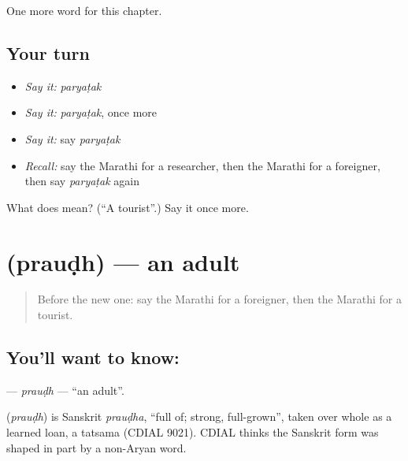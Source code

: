 \begin{grammarlens}[title={What you've built}]
One more word for this chapter.
\end{grammarlens}

\subsection*{Your turn}
\begin{itemize}
\raggedright
  \item \emph{Say it:} \emph{paryaṭak}
  \item \emph{Say it:} \emph{paryaṭak}, once more
  \item \emph{Say it:} say \emph{paryaṭak}
  \item \emph{Recall:} say the Marathi for a researcher, then the Marathi for a foreigner, then say \emph{paryaṭak} again
\end{itemize}

\begin{tcolorbox}[breakable,colback=teal!4,colframe=teal!35!black,title={Before you move on}]
What does  mean? (\textquotedblleft{}A tourist\textquotedblright{}.) Say it once more.
\end{tcolorbox}
\section[\texorpdfstring{\mr{प्रौढ} (prauḍh)}{प्रौढ (prauḍh)}]{ (prauḍh) — an adult}

\label{lesson:MR-C238-praudh}



\begin{quote}
Before the new one: say the Marathi for a foreigner, then the Marathi for a tourist.
\end{quote}

\subsection*{You'll want to know: }
\textbf{} — \emph{prauḍh} — \textquotedblleft{}an adult\textquotedblright{}.

\begin{cousinweb}
\textbf{} (\emph{prauḍh}) is Sanskrit \emph{prauḍha}, \textquotedblleft{}full of; strong, full-grown\textquotedblright{}, taken over whole as a learned loan, a tatsama (CDIAL 9021). CDIAL thinks the Sanskrit form was shaped in part by a non-Aryan word.
\end{cousinweb}

